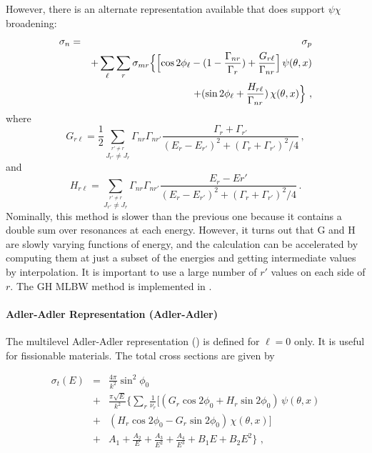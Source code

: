 However, there is an alternate representation available that
does support $\psi\chi$ broadening:
\begin{eqnarray}
  \sigma_n&=&\sigma_p\nonumber\\
      & &+\sum_{\ell}\sum_r\sigma_{mr}
    \Bigl\lbrace \Bigl[ \cos 2\phi_\ell - (1-{{\Gamma_{nr}}
    \over {\Gamma_r}})+\frac{G_{r\ell}}{\Gamma_{nr}} \Bigr]
      \,\psi(\theta,x)\nonumber\\
    & &+(\sin 2\phi_\ell +\frac{H_{r\ell}}{\Gamma_{nr}})
      \,\chi(\theta,x) \Bigr\rbrace\,\,,
\end{eqnarray}
where
\begin{equation}
   G_{r\ell}=\frac{1}{2}
    \sum_{\stackrel{\displaystyle r'\ne r}
    {\displaystyle J_{r'}\ne J_r}}
    \Gamma_{nr}\Gamma_{nr'}\frac{\Gamma_r+\Gamma_{r'}}
      {(E_r-E_{r'})^2+(\Gamma_r+\Gamma_{r'})^2/4} \,,
\end{equation}
and
\begin{equation}
   H_{r\ell}=\sum_{\stackrel{\displaystyle r'\ne r}
    {\displaystyle J_{r'}\ne J_r}}
    \Gamma_{nr}\Gamma_{nr'}\frac{E_r-E{r'}}
      {(E_r-E_{r'})^2+(\Gamma_r+\Gamma_{r'})^2/4} \,.
\end{equation}
Nominally, this method is slower than the previous one because
it contains a double sum over resonances at each energy.  However,
it turns out that G and H are slowly varying functions of energy,
and the calculation can be accelerated by computing them at just
a subset of the energies and getting intermediate values by
interpolation.  It is important to use a large number of $r'$
values on each side of $r$.  The GH MLBW method is implemented
in .

\paragraph{Adler-Adler Representation (Adler-Adler)}
The multilevel Adler-Adler representation
 ()
is defined for $\ell{=}0$ only.  It is useful for fissionable
materials.  The total cross sections are given by

\begin{eqnarray}
  \sigma_t(E)&=&{\frac{4\pi}{k^2}}\sin^2\phi_0\nonumber\\
  &+&{\frac{\pi\sqrt{E}}{k^2}} \biggl\lbrace
    \sum_r {\frac{1}{\nu_r}} \biggl[(G_r\cos 2\phi_0
    +H_r\sin 2\phi_0 ) \,\psi(\theta,x)\nonumber\\
  &+&(H_r\cos 2\phi_0 - G_r\sin 2\phi_0) \,\chi(\theta,x)
    \biggr]\nonumber\\
  &+&A_1+{\frac{A_2}{E}}+{\frac{A_3}{E^2}}
    +{\frac{A_4}{E^3}}+B_1E+B_2 E^2 \biggr\rbrace \,\,,
\end{eqnarray}

